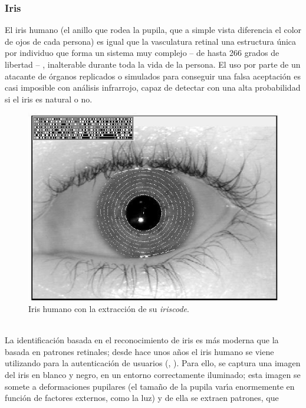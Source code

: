 \subsubsection{Iris}
El iris humano (el anillo que rodea la pupila, que a simple vista diferencia 
el color de ojos de cada persona) es igual que la vasculatura retinal una 
estructura \'unica por individuo que
forma un sistema muy complejo -- de hasta 266 grados de libertad -- , 
inalterable durante toda la vida de la persona. El uso por parte de un atacante
de \'organos replicados o simulados para conseguir una falsa aceptaci\'on es 
casi imposible con an\'alisis infrarrojo, capaz de detectar con una alta 
probabilidad si el iris es natural o no.\\
\begin{figure}[t]
\begin{center}
\includegraphics[width=\textwidth]{iriscode.png}
\end{center}
\caption{Iris humano con la extracci\'on de su {\it iriscode}.}
\label{iriscode}
\end{figure}
\\La identificaci\'on basada en el reconocimiento de iris es m\'as moderna que
la basada en patrones retinales; desde hace unos a\~nos el iris humano se viene 
utilizando para la autenticaci\'on de usuarios (\cite{kn:bou96}, 
\cite{kn:dau97}). Para ello, se captura una imagen del iris en blanco
y negro, en un entorno correctamente iluminado; esta imagen se somete a 
deformaciones pupilares (el tama\~no de la pupila var\'{\i}a enormemente en
funci\'on de factores externos, como la luz) y de ella se extraen patrones, que
